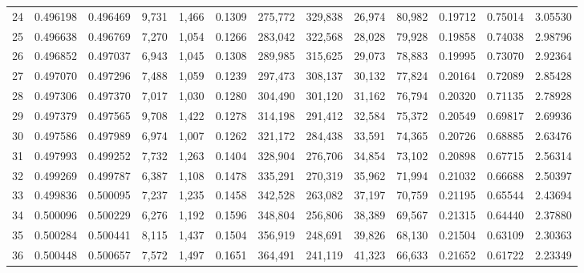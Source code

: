 \begin{tabular}{rrrrrrrrrrrrr}
24 &  0.496198 &  0.496469 &   9,731 &  1,466 &                                     0.1309 &  275,772 &  329,838 &   26,974 &   80,982 &  0.19712 &  0.75014 &  3.05530 \\
25 &  0.496638 &  0.496769 &   7,270 &  1,054 &                                     0.1266 &  283,042 &  322,568 &   28,028 &   79,928 &  0.19858 &  0.74038 &  2.98796 \\
26 &  0.496852 &  0.497037 &   6,943 &  1,045 &                                     0.1308 &  289,985 &  315,625 &   29,073 &   78,883 &  0.19995 &  0.73070 &  2.92364 \\
27 &  0.497070 &  0.497296 &   7,488 &  1,059 &                                     0.1239 &  297,473 &  308,137 &   30,132 &   77,824 &  0.20164 &  0.72089 &  2.85428 \\
28 &  0.497306 &  0.497370 &   7,017 &  1,030 &                                     0.1280 &  304,490 &  301,120 &   31,162 &   76,794 &  0.20320 &  0.71135 &  2.78928 \\
29 &  0.497379 &  0.497565 &   9,708 &  1,422 &                                     0.1278 &  314,198 &  291,412 &   32,584 &   75,372 &  0.20549 &  0.69817 &  2.69936 \\
30 &  0.497586 &  0.497989 &   6,974 &  1,007 &                                     0.1262 &  321,172 &  284,438 &   33,591 &   74,365 &  0.20726 &  0.68885 &  2.63476 \\
31 &  0.497993 &  0.499252 &   7,732 &  1,263 &                                     0.1404 &  328,904 &  276,706 &   34,854 &   73,102 &  0.20898 &  0.67715 &  2.56314 \\
32 &  0.499269 &  0.499787 &   6,387 &  1,108 &                                     0.1478 &  335,291 &  270,319 &   35,962 &   71,994 &  0.21032 &  0.66688 &  2.50397 \\
33 &  0.499836 &  0.500095 &   7,237 &  1,235 &                                     0.1458 &  342,528 &  263,082 &   37,197 &   70,759 &  0.21195 &  0.65544 &  2.43694 \\
34 &  0.500096 &  0.500229 &   6,276 &  1,192 &                                     0.1596 &  348,804 &  256,806 &   38,389 &   69,567 &  0.21315 &  0.64440 &  2.37880 \\
35 &  0.500284 &  0.500441 &   8,115 &  1,437 &                                     0.1504 &  356,919 &  248,691 &   39,826 &   68,130 &  0.21504 &  0.63109 &  2.30363 \\
36 &  0.500448 &  0.500657 &   7,572 &  1,497 &                                     0.1651 &  364,491 &  241,119 &   41,323 &   66,633 &  0.21652 &  0.61722 &  2.23349 \\

\end{tabular}
